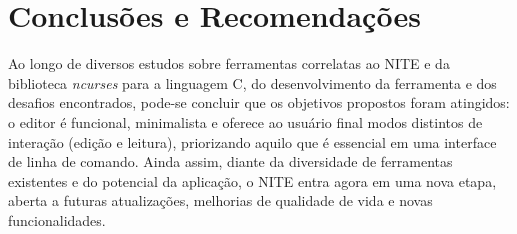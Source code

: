 \chapter{Conclusões e Recomendações}
\label{cap:05}


Ao longo de diversos estudos sobre ferramentas correlatas ao NITE e da biblioteca \textit{ncurses} para a linguagem C, do desenvolvimento da ferramenta e dos desafios encontrados, pode-se concluir que os objetivos propostos foram atingidos: o editor é funcional, minimalista e oferece ao usuário final modos distintos de interação (edição e leitura), priorizando aquilo que é essencial em uma interface de linha de comando. Ainda assim, diante da diversidade de ferramentas existentes e do potencial da aplicação, o NITE entra agora em uma nova etapa, aberta a futuras atualizações, melhorias de qualidade de vida e novas funcionalidades.